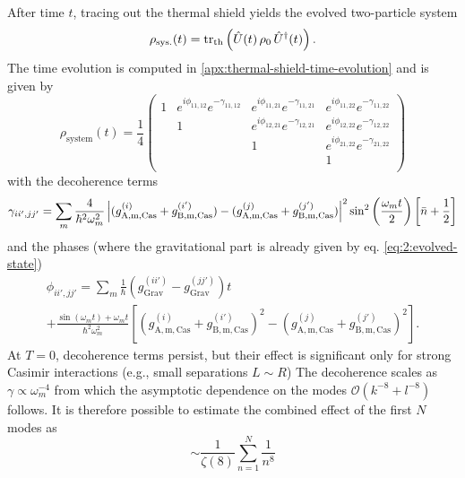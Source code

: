 After time $t$, tracing out the thermal shield yields the evolved two-particle system
\begin{equation}
  \rho_\mathrm{sys.}(t) = \tr_\mathrm{th}\left(\hat{U}(t) \, \rho_0 \, \hat{U}^\dagger(t)\right) .
\end{equation}
The time evolution is computed in \cref{apx:thermal-shield-time-evolution} and is given by
\begin{equation}
  \rho_\mathrm{system}(t) = \frac{1}{4} \begin{pmatrix}
    1 & e^{i\phi_{11,12}} e^{-\gamma_{11,12}} & e^{i\phi_{11,21}} e^{-\gamma_{11,21}} & e^{i\phi_{11,22}} e^{-\gamma_{11,22}} \\
    & 1 & e^{i\phi_{12,21}} e^{-\gamma_{12,21}} & e^{i\phi_{12,22}} e^{-\gamma_{12,22}} \\
    & & 1 & e^{i\phi_{21,22}} e^{-\gamma_{21,22}} \\
    & & & 1 \\
  \end{pmatrix}
\end{equation}
with the decoherence terms
\begin{equation}\label{eq:5:analytical-decoherence}
  \gamma_{ii',jj'} = \sum_m \frac{4}{\hbar^2\omega_m^2} \left\lvert(g^{(i)}_\mathrm{A,m,Cas} + g^{(i')}_\mathrm{B,m,Cas}) - (g^{(j)}_\mathrm{A,m,Cas} + g^{(j')}_\mathrm{B,m,Cas})\right\rvert^2 \sin^2\left(\frac{\omega_m t}{2}\right) \left[\bar{n} + \frac{1}{2}\right]
\end{equation}
and the phases (where the gravitational part is already given by eq. \eqref{eq:2:evolved-state})
\begin{multline}\label{eq:5:analytical-phases}
  \phi_{ii',jj'} = \sum_m \frac{1}{\hbar} \left( g^{(ii')}_\mathrm{Grav} - g^{(jj')}_\mathrm{Grav} \right) t \\
  + \frac{\sin(\omega_m t)+\omega_m t}{\hbar^2\omega_m^2}\left[(g^{(i)}_\mathrm{A,m,Cas} + g^{(i')}_\mathrm{B,m,Cas})^2 - (g^{(j)}_\mathrm{A,m,Cas} + g^{(j')}_\mathrm{B,m,Cas})^2\right] .
\end{multline}
At $T=0$, decoherence terms persist, but their effect is significant only for strong Casimir interactions (e.g., small separations $L\sim R$)
The decoherence scales as $\gamma \propto \omega_m^{-4}$ from which the asymptotic dependence on the modes $\mathcal{O}(k^{-8}+l^{-8})$ follows.
It is therefore possible to estimate the combined effect of the first $N$ modes as
\begin{equation}\label{eq:5:effect-of-a-mode}
  \sim \frac{1}{\zeta(8)} \sum_{n=1}^{N} \frac{1}{n^8}
\end{equation}
